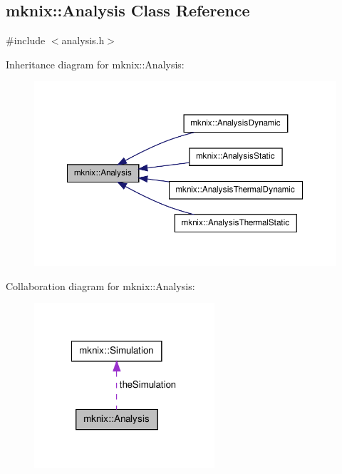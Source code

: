 \hypertarget{classmknix_1_1_analysis}{\subsection{mknix\-:\-:Analysis Class Reference}
\label{classmknix_1_1_analysis}
}


{\ttfamily \#include $<$analysis.\-h$>$}



Inheritance diagram for mknix\-:\-:Analysis\-:\nopagebreak
\begin{figure}[H]
\begin{center}
\leavevmode
\includegraphics[width=350pt]{dc/d6f/classmknix_1_1_analysis__inherit__graph}
\end{center}
\end{figure}


Collaboration diagram for mknix\-:\-:Analysis\-:\nopagebreak
\begin{figure}[H]
\begin{center}
\leavevmode
\includegraphics[width=190pt]{d5/d73/classmknix_1_1_analysis__coll__graph}
\end{center}
\end{figure}
